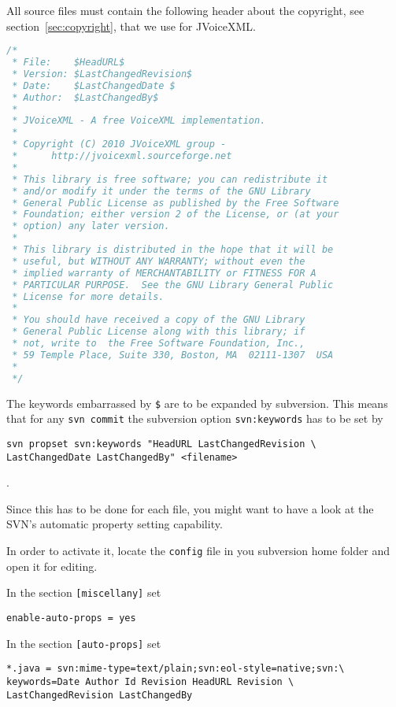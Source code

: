 \documentclass[11pt,a4paper]{article}
\begin{document}
All source files must contain the following header about the 
copyright, see section~\ref{sec:copyright}, that we use for JVoiceXML.

\begin{lstlisting}[language=Java]
/*
 * File:    $HeadURL$
 * Version: $LastChangedRevision$
 * Date:    $LastChangedDate $
 * Author:  $LastChangedBy$
 *
 * JVoiceXML - A free VoiceXML implementation.
 *
 * Copyright (C) 2010 JVoiceXML group - 
 *      http://jvoicexml.sourceforge.net
 *
 * This library is free software; you can redistribute it 
 * and/or modify it under the terms of the GNU Library 
 * General Public License as published by the Free Software 
 * Foundation; either version 2 of the License, or (at your 
 * option) any later version.
 *
 * This library is distributed in the hope that it will be 
 * useful, but WITHOUT ANY WARRANTY; without even the 
 * implied warranty of MERCHANTABILITY or FITNESS FOR A 
 * PARTICULAR PURPOSE.  See the GNU Library General Public 
 * License for more details.
 *
 * You should have received a copy of the GNU Library 
 * General Public License along with this library; if 
 * not, write to  the Free Software Foundation, Inc., 
 * 59 Temple Place, Suite 330, Boston, MA  02111-1307  USA
 *
 */
\end{lstlisting}

The keywords embarrassed by \texttt{\$} are to be expanded by 
subversion. 
This means that for any \texttt{svn commit} the subversion
option \texttt{svn:keywords} has to be set by

\begin{lstlisting}
svn propset svn:keywords "HeadURL LastChangedRevision \
LastChangedDate LastChangedBy" <filename>
\end{lstlisting}.

Since this has to be done for each file, you might want to have a look
at the SVN's automatic property setting capability.

In order to activate it, locate the \texttt{config} file in you subversion home
folder and open it for editing.

In the section \texttt{[miscellany]} set
\begin{lstlisting}
enable-auto-props = yes
\end{lstlisting}

In the section \texttt{[auto-props]} set
\begin{lstlisting}
*.java = svn:mime-type=text/plain;svn:eol-style=native;svn:\
keywords=Date Author Id Revision HeadURL Revision \
LastChangedRevision LastChangedBy
\end{lstlisting}
\end{document}
